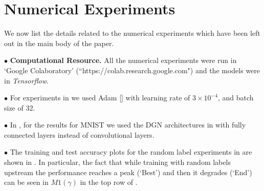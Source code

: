 \appendix

\section{Numerical Experiments}
We now list the details related to the numerical experiments which have been left out in the main body of the paper.

\indent \quad $\bullet$ \textbf{Computational Resource.} All the numerical experiments were run in `Google Colaboratory' (``https://colab.research.google.com") and the models were in \emph{Tensorflow}.



\indent \quad $\bullet$ For experiments in  we used Adam [] with learning rate of $3\times 10^{-4}$, and batch size of 32.


\indent \quad $\bullet$ In , for the results  for MNIST we used the DGN architectures in  with fully connected layers instead of convolutional layers. 

\indent \quad $\bullet$ The training and test accuracy plots for the random label experiments in  are shown in . In particular, the fact that while training with random labels upstream the performance reaches a peak (`Best') and then it degrades (`End') can be seen in $M1(\gamma)$ in the top row of . 

